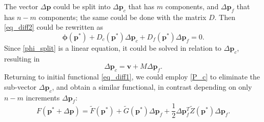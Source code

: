 The vector $\Delta\boldsymbol{p}$ could be split into $\Delta\boldsymbol{p}_c$ that has $m$ components, and $\Delta\boldsymbol{p}_f$ that has $n-m$ components; the same could be done with the matrix $D$. Then \eqref{eq_diff2} could be rewritten as
\begin{equation}\label{phi_split}
\boldsymbol{\phi}(\boldsymbol{p}^*) + D_c(\boldsymbol{p}^*) \Delta\boldsymbol{p}_c + D_f(\boldsymbol{p}^*) \Delta\boldsymbol{p}_f = 0.
\end{equation}
Since \eqref{phi_split} is a linear equation, it could be solved in relation to $\Delta\boldsymbol{p}_c$, resulting in
\begin{equation}\label{P_c}
\Delta\boldsymbol{p}_c = \boldsymbol{v} + M \Delta\boldsymbol{p}_f.
\end{equation}
Returning to initial functional \eqref{eq_diff1}, we could employ \eqref{P_c} to eliminate the sub-vector $\Delta\boldsymbol{p}_c$, and obtain a similar functional, in contrast depending on only $n-m$ increments $\Delta\boldsymbol{p}_f$:
\begin{equation}\label{func_fin}
F(\boldsymbol{p}^*+\Delta\boldsymbol{p}) = \tilde F(\boldsymbol{p}^*) + \tilde G(\boldsymbol{p}^*) \Delta\boldsymbol{p}_f + \frac{1}{2}\Delta\boldsymbol{p}_f^T \tilde Z(\boldsymbol{p}^*) \Delta\boldsymbol{p}_f.
\end{equation}
